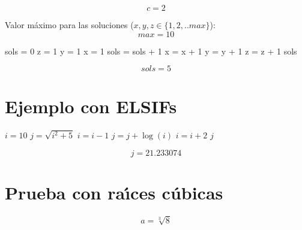 \documentclass{article}
\begin{document}
\begin{equation}
c = 2
\label{eq:calc:c}
\end{equation}

Valor m\'aximo para las soluciones ($x, y, z \in \{1,2,..max\}$):
\begin{equation}
max = 10
\label{eq:calc:max}
\end{equation}



\begin{algorithm}
\caption{N\'umero de soluciones}
\label{alg:calc:sols}
\begin{algorithmic}
    \STATE sols = 0
    \STATE z = 1
        \STATE y = 1
            \STATE x = 1
                    \STATE sols = sols + 1
                \ENDIF
                \STATE x = x + 1
            \ENDWHILE
            \STATE y = y + 1
        \ENDWHILE
        \STATE z = z + 1
    \ENDWHILE
    \RETURN sols
\end{algorithmic}
\end{algorithm}

\begin{equation}
    sols = 
    5
    \label{eq:res:sols}
\end{equation}


\section{Ejemplo con ELSIFs}

\begin{algorithm}
\caption{Ejemplo de un algoritmo con ELSIFs anidados}
\label{alg:calc:j}
\begin{algorithmic}
        \STATE $i = 10$
        \STATE $j = \sqrt{i^2 + 5}$
            \STATE $i = i - 1$
                \STATE $j = j + \log(i)$
            \ENDWHILE
            \STATE $i = i + 2$
        \ENDIF
        \RETURN $j$
\end{algorithmic}
\end{algorithm}



\begin{equation}
    j = 
    21.233074
    \label{eq:res:j}
\end{equation}

\section{Prueba con ra\'{\i}ces c\'ubicas}
\begin{equation}
    a = \sqrt[3]{8}
    \label{eq:calc:a}
\end{equation}
\end{document}
